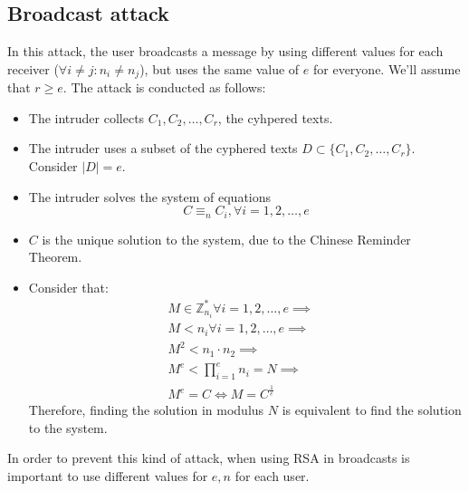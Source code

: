 \subsection{Broadcast attack}
In this attack, the user broadcasts a message by using different values for each receiver ($\forall i \neq j: n_{i} \neq n_{j}$), but uses the same value of $e$ for everyone. We'll assume that $r \geq e$.\newline
The attack is conducted as follows:
\begin{itemize}
    \item The intruder collects $C_{1}, C_{2}, \dots, C_{r}$, the cyhpered texts.
    \item The intruder uses a subset of the cyphered texts $D \subset \{C_{1}, C_{2}, \dots, C_{r}\}$. Consider $|D| = e$.
    \item The intruder solves the system of equations
    \[C \equiv_{n} C_{i}, \forall i = 1, 2, \dots, e\]
    \item $C$ is the unique solution to the system, due to the Chinese Reminder Theorem.
    \item Consider that:
    \begin{align*}
        M \in \mathbb{Z}_{n_{i}}^{*} \forall i = 1, 2, \dots, e \implies &\\
        M < n_{i} \forall i = 1, 2, \dots, e \implies &\\
        M^{2} < n_{1} \cdot n_{2} \implies &\\
        M^{e} < \prod_{i=1}^{e} n_{i} = N \implies &\\
        M^{e} = C \iff M = C^{\frac{1}{e}}
    \end{align*}
    Therefore, finding the solution in modulus $N$ is equivalent to find the solution to the system.
\end{itemize}
In order to prevent this kind of attack, when using RSA in broadcasts is important to use different values for $e,n$ for each user.

